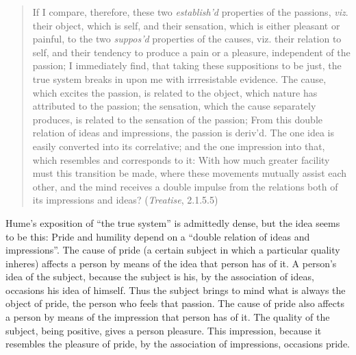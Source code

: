 \begin{quote}
    If I compare, therefore, these two \emph{establish'd} properties of the passions, \emph{viz}. their object, which is self, and their sensation, which is either pleasant or painful, to the two \emph{suppos'd} properties of the causes, viz. their relation to self, and their tendency to produce a pain or a pleasure, independent of the passion; I immediately find, that taking these suppositions to be just, the true system breaks in upon me with irrresistable evidence. The cause, which excites the passion, is related to the object, which nature has attributed to the passion; the sensation, which the cause separately produces, is related to the sensation of the passion; From this double relation of ideas and impressions, the passion is deriv'd. The one idea is easily converted into its correlative; and the one impression into that, which resembles and corresponds to it: With how much greater facility must this transition be made, where these movements mutually assist each other, and the mind receives a double impulse from the relations both of its impressions and ideas? (\emph{Treatise}, 2.1.5.5)
\end{quote}


Hume's exposition of ``the true system'' is admittedly dense, but the idea seems to be this: Pride and humility depend on a ``double relation of ideas and impressions''. The cause of pride (a certain subject in which a particular quality inheres) affects a person by means of the idea that person has of it. A person's idea of the subject, because the subject is his, by the association of ideas, occasions his idea of himself. Thus the subject brings to mind what is always the object of pride, the person who feels that passion. The cause of pride also affects a person by means of the impression that person has of it. The quality of the subject, being positive, gives a person pleasure. This impression, because it resembles the pleasure of pride, by the association of impressions, occasions pride. \change

% 

